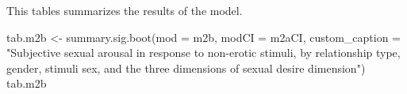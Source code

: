 \documentclass[
  bookmarksnumbered]{article}
\newenvironment{Shaded}{\begin{snugshade}}{\end{snugshade}}
\newcommand{\AttributeTok}[1]{\textcolor[rgb]{0.80,0.80,0.80}{#1}}
\newcommand{\FunctionTok}[1]{\textcolor[rgb]{0.94,0.94,0.56}{#1}}
\newcommand{\NormalTok}[1]{\textcolor[rgb]{0.80,0.80,0.80}{#1}}
\newcommand{\OtherTok}[1]{\textcolor[rgb]{0.94,0.94,0.56}{#1}}
\newcommand{\StringTok}[1]{\textcolor[rgb]{0.80,0.58,0.58}{#1}}
\begin{document}
This tables summarizes the results of the model.

\begin{Shaded}
\begin{Highlighting}[]
\NormalTok{tab.m2b }\OtherTok{\textless{}{-}} \FunctionTok{summary.sig.boot}\NormalTok{(}\AttributeTok{mod =}\NormalTok{ m2b,}
                            \AttributeTok{modCI =}\NormalTok{ m2aCI, }
                            \AttributeTok{custom\_caption =} \StringTok{"Subjective sexual arousal in response to }
\StringTok{                            non{-}erotic stimuli, by relationship type, gender, stimuli sex, }
\StringTok{                            and the three dimensions of sexual desire dimension"}\NormalTok{)}
\NormalTok{tab.m2b}
\end{Highlighting}
\end{Shaded}
\end{document}
